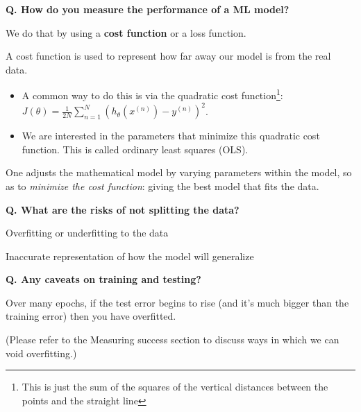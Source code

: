 \begin{frame}[fragile]{\textbf{Q. How do you measure the performance of a ML model?}}
  \begin{wideitemize}
    \item We do that by using a \textbf{cost function} or a loss function.
    \item A cost function is used to represent how far away our model is from the real data.
    \begin{itemize}
      \item A common way to do this is via the quadratic cost function\footnote{This is
      just the sum of the squares of the vertical distances between the points and the straight line}:\vspace{.4em}
      $J(\theta) = \frac{1}{2N}\sum^{N}_{n=1}(h_{\theta}(x^{(n)}) - y^{(n)})^{2}$.\vspace{.4em}
      \item We are interested in the parameters that minimize this quadratic cost function.
      This is called ordinary least squares (OLS).
    \end{itemize}
    \item One adjusts the mathematical model by varying parameters within the model, so as
    to \textit{minimize the cost function}: giving the best model that fits the data.
  \end{wideitemize}
\end{frame}

\begin{frame}[fragile]{\textbf{Q. What are the risks of not splitting the data?}}
  \begin{wideitemize}
    \item Overfitting or underfitting to the data
    \item Inaccurate representation of how the model will generalize
  \end{wideitemize}
\end{frame}

\begin{frame}[fragile]{\textbf{Q. Any caveats on training and testing?}}
  \begin{wideitemize}
    \item Over many epochs, if the test error begins to rise (and it's much
    bigger than the training error) then you have overfitted.
    \item (Please refer to the Measuring success section to discuss ways in
    which we can void overfitting.)
  \end{wideitemize}
\end{frame}

